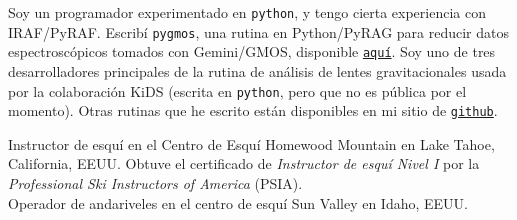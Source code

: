 \documentclass[11pt]{article}
\begin{document}


Soy un programador experimentado en \texttt{python}, y tengo cierta experiencia con IRAF/PyRAF. Escrib\'i \texttt{pygmos}, una rutina en Python/PyRAG para reducir datos espectrosc\'opicos tomados con Gemini/GMOS, disponible \href{https://github.com/cristobal-sifon/pygmos/}{\texttt{aqu\'i}}. Soy uno de tres desarrolladores principales de la rutina de an\'alisis de lentes gravitacionales usada por la colaboraci\'on KiDS (escrita en \texttt{python}, pero que no es p\'ublica por el momento). Otras rutinas que he escrito est\'an disponibles en mi sitio de \href{https://github.com/cristobal-sifon}{\texttt{github}}.\\



\noindent
{} Instructor de esqu\'i en el Centro de Esqu\'i Homewood Mountain en Lake Tahoe, California, EEUU. Obtuve el certificado de \emph{Instructor de esqu\'i Nivel I} por la \emph{Professional Ski Instructors of America} (PSIA).\\
 Operador de andariveles en el centro de esqu\'i Sun Valley en Idaho, EEUU.\\

\vspace{0.5cm}



\end{document}
